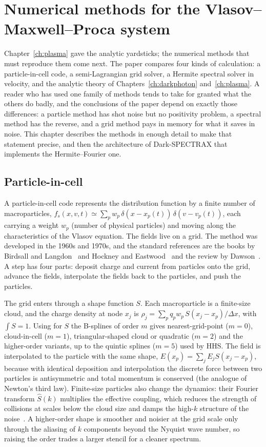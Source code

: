 \chapter{Numerical methods for the Vlasov--Maxwell--Proca system}\label{ch:numerics}

Chapter~\ref{ch:plasma} gave the analytic yardsticks; the numerical methods that must reproduce them come next. The paper compares four kinds of calculation: a particle-in-cell code, a semi-Lagrangian grid solver, a Hermite spectral solver in velocity, and the analytic theory of Chapters~\ref{ch:darkphoton} and~\ref{ch:plasma}. A reader who has used one family of methods tends to take for granted what the others do badly, and the conclusions of the paper depend on exactly those differences: a particle method has shot noise but no positivity problem, a spectral method has the reverse, and a grid method pays in memory for what it saves in noise. This chapter describes the methods in enough detail to make that statement precise, and then the architecture of Dark-SPECTRAX that implements the Hermite--Fourier one.

\section{Particle-in-cell}\label{sec:pic}

A particle-in-cell code represents the distribution function by a finite number of macroparticles, $f_s(x,v,t)\simeq\sum_pw_p\,\delta(x-x_p(t))\,\delta(v-v_p(t))$, each carrying a weight $w_p$ (number of physical particles) and moving along the characteristics of the Vlasov equation. The fields live on a grid. The method was developed in the 1960s and 1970s, and the standard references are the books by Birdsall and Langdon~\citep{BirdsallLangdon1985} and Hockney and Eastwood~\citep{HockneyEastwood1988} and the review by Dawson~\citep{Dawson1983}. A step has four parts: deposit charge and current from particles onto the grid, advance the fields, interpolate the fields back to the particles, and push the particles.

The grid enters through a shape function $S$. Each macroparticle is a finite-size cloud, and the charge density at node $x_j$ is $\rho_j=\sum_pq_pw_p\,S(x_j-x_p)/\Delta x$, with $\int S=1$. Using for $S$ the B-splines of order $m$ gives nearest-grid-point ($m=0$), cloud-in-cell ($m=1$), triangular-shaped cloud or quadratic ($m=2$) and the higher-order variants, up to the quintic splines ($m=5$) used by HHS. The field is interpolated to the particle with the same shape, $E(x_p)=\sum_jE_jS(x_j-x_p)$, because with identical deposition and interpolation the discrete force between two particles is antisymmetric and total momentum is conserved (the analogue of Newton's third law). Finite-size particles also change the dynamics: their Fourier transform $\hat S(k)$ multiplies the effective coupling, which reduces the strength of collisions at scales below the cloud size and damps the high-$k$ structure of the noise~\citep{LangdonBirdsall1970}. A higher-order shape is smoother and noisier at the grid scale only through the aliasing of $k$ components beyond the Nyquist wave number, so raising the order trades a larger stencil for a cleaner spectrum.

